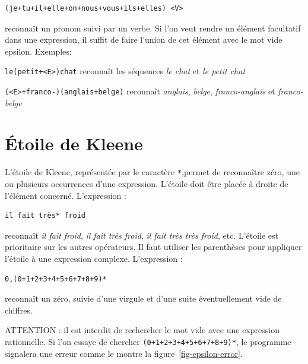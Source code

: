\begin{verbatim}
(je+tu+il+elle+on+nous+vous+ils+elles) <V>
\end{verbatim}

\noindent
reconnaît un pronom suivi par un verbe. Si l’on veut rendre un élément facultatif dans
une expression, il suffit de faire l’union de cet élément avec le mot vide epsilon.
 Exemples:

\bigskip
\noindent \verb$le(petit+<E>)chat$ reconnaît les séquences \textit{le chat}
et \textit{le petit chat}

\smallskip
\noindent \verb$(<E>+franco-)(anglais+belge)$ reconnaît \textit{anglais}, \textit{belge},
\textit{franco-anglais} et \textit{franco-belge}

\section{Étoile de Kleene}
\index{\verb+*+}
L’étoile de Kleene, représentée par le caractère \verb+*+,permet de reconnaître zéro, une ou
plusieurs occurrences d’une expression. L’étoile doit être placée à droite de l’élément concerné.
L’expression :


\begin{verbatim}
il fait très* froid
\end{verbatim}

\noindent reconnaît \textit{il fait froid}, \textit{il fait très froid},
\textit{il fait très très froid}, etc. L’étoile est prioritaire sur les
autres opérateurs. Il faut utiliser les parenthèses pour appliquer l’étoile à une expression
complexe. L’expression :


\begin{verbatim}
0,(0+1+2+3+4+5+6+7+8+9)*
\end{verbatim}

\noindent reconnaît un zéro, suivie d’une virgule et d’une suite éventuellement vide de chiffres.

\bigskip
\noindent ATTENTION : il est interdit de rechercher le mot vide avec une expression rationnelle.
Si l’on essaye de chercher \verb$(0+1+2+3+4+5+6+7+8+9)*$, le programme signalera une erreur
comme le montre la figure~\ref{fig-epsilon-error}.


